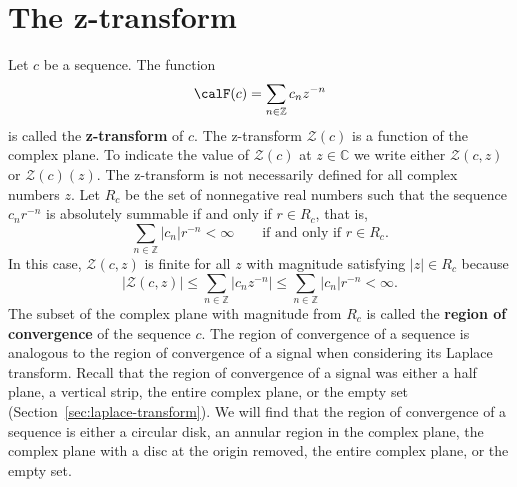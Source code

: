 \documentclass[11pt,a4paper]{book}
\theoremstyle{plain}
\numberwithin{equation}{section}
\newcommand{\ints}{{\mathbb Z}}
\newcommand{\complex}{{\mathbb C}}
\newcommand{\term}{\textbf}
\newcommand{\abs}[1]{\left\vert #1 \right\vert}
\newcommand{\sabs}[1]{\vert #1 \vert}
\begin{document}


\section{The z-transform}

\newcommand{\calZ}{{\mathcal Z}}

Let $c$ be a sequence.  The function
\[
\calF(c) = \sum_{n \in \ints} c_n z^{-n}
\]
is called the \term{z-transform} of $c$. The z-transform $\calZ(c)$ is a function of the complex plane. To indicate the value of $\calZ(c)$ at $z \in \complex$ we write either $\calZ(c,z)$ or $\calZ(c)(z)$.  The z-transform is not necessarily defined for all complex numbers $z$.  Let $R_c$ be the set of nonnegative real numbers such that the sequence $c_n r^{-n}$ is absolutely summable if and only if $r \in R_c$, that is,
\[
\sum_{n \in \ints} \abs{c_n} r^{-n} < \infty \qquad \text{if and only if $r \in R_c$}.
\]
In this case, $\calZ(c,z)$ is finite for all $z$ with magnitude satisfying $\abs{z} \in R_c$ because 
\[
\sabs{\calZ(c,z)} \leq \sum_{n \in \ints} \abs{c_n z^{-n}} \leq \sum_{n \in \ints} \abs{c_n} r^{-n} < \infty.
\]
The subset of the complex plane with magnitude from $R_c$ is called the \term{region of convergence} of the sequence $c$.  The region of convergence of a sequence is analogous to the region of convergence of a signal when considering its Laplace transform.  Recall that the region of convergence of a signal was either a half plane, a vertical strip, the entire complex plane, or the empty set (Section~\ref{sec:laplace-transform}).  We will find that the region of convergence of a sequence is either a circular disk, an annular region in the complex plane, the complex plane with a disc at the origin removed, the entire complex plane, or the empty set.
\end{document}
